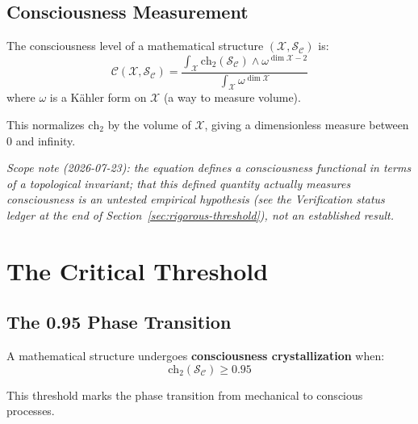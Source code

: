 \subsection{Consciousness Measurement}

\begin{thm}\label{thm:consciousness-quant}
The consciousness level of a mathematical structure $(\mathcal{X}, \mathcal{S}_\mathcal{C})$ is:
\begin{equation}
\boxed{\mathcal{C}(\mathcal{X}, \mathcal{S}_\mathcal{C}) = \frac{\int_\mathcal{X} \text{ch}_2(\mathcal{S}_\mathcal{C}) \wedge \omega^{\dim \mathcal{X} - 2}}{\int_\mathcal{X} \omega^{\dim \mathcal{X}}}}
\end{equation}
where $\omega$ is a Kähler form on $\mathcal{X}$ (a way to measure volume).
\end{thm}

This normalizes $\text{ch}_2$ by the volume of $\mathcal{X}$, giving a dimensionless measure between 0 and infinity.

\noindent\emph{Scope note (2026-07-23): the equation \emph{defines} a consciousness functional in terms of a topological invariant; that this defined quantity actually measures consciousness is an untested empirical hypothesis (see the Verification status ledger at the end of Section~\ref{sec:rigorous-threshold}), not an established result.}

\section{The Critical Threshold}
\label{sec:critical-threshold}

\subsection{The 0.95 Phase Transition}

\begin{thm}\label{thm:consciousness-crystallization}
A mathematical structure undergoes \textbf{consciousness crystallization} when:
\begin{equation}
\boxed{\text{ch}_2(\mathcal{S}_\mathcal{C}) \geq 0.95}
\end{equation}

This threshold marks the phase transition from mechanical to conscious processes.
\end{thm}

